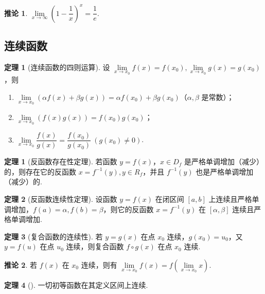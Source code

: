 \documentclass[zihao=-4,linespread=1.8,UTF8,nothm]{aytony_base}
\theoremstyle{definition}
\newtheorem*{theorem*}{\indent\heiti\textbf{定理}}
\newtheorem{theorem}{\indent\heiti\textbf{定理}}[subsection]
\newtheorem*{corollary}{\indent\heiti\textbf{推论}}
\begin{document}
\begin{corollary}
    $\lim\limits_{x \to \infty} \left(1-\dfrac{1}{x}\right)^x = \dfrac{1}{e}$.
\end{corollary}

\subsection{连续函数}

\begin{theorem*}[连续函数的四则运算]
    设 $\lim\limits_{x \to x_0} f(x) = f(x_0), \lim\limits_{x \to x_0} g(x)= g(x_0)$，则
    \begin{enumerate}
        \item $\lim\limits_{x \to x_0} (\alpha f(x) + \beta g(x)) = \alpha f(x_0) + \beta g(x_0)$（$\alpha, \beta$ 是常数）；
        \item $\lim\limits_{x \to x_0} (f(x)g(x)) = f(x_0)g(x_0)$；
        \item $\lim\limits_{x \to x_0} \dfrac{f(x)}{g(x)} = \dfrac{f(x_0)}{g(x_0)}\ (g(x_0) \neq 0)$.
    \end{enumerate}
\end{theorem*}

\begin{theorem}[反函数存在性定理]
    若函数 $y = f(x)$，$x \in D_f$ 是严格单调增加（减少）的，则存在它的反函数 $x = f^{-1}(y), y \in R_f$，并且 $f^{-1}(y)$ 也是严格单调增加（减少）的.
\end{theorem}

\begin{theorem}[反函数连续性定理]
    设函数 $y=f(x)$ 在闭区间 $[a, b]$ 上连续且严格单调增加，$f(a) = \alpha, f(b) = \beta$，则它的反函数 $x = f^{-1}(y)$ 在 $[\alpha, \beta]$ 连续且严格单调增加.
\end{theorem}

\begin{theorem}[复合函数的连续性]
    若 $y = g(x)$ 在点 $x_0$ 连续，$g(x_0) = u_0$，又 $y = f(u)$ 在点 $u_0$ 连续，则复合函数 $f \circ g(x)$ 在点 $x_0$ 连续.
\end{theorem}

\begin{corollary}
    若 $f(x)$ 在 $x_0$ 连续，则有 $\lim\limits_{x \to x_0} f(x) = f\left(\lim\limits_{x \to x_0}x \right)$.
\end{corollary}

\begin{theorem}[]
    一切初等函数在其定义区间上连续.
\end{theorem}
\end{document}
